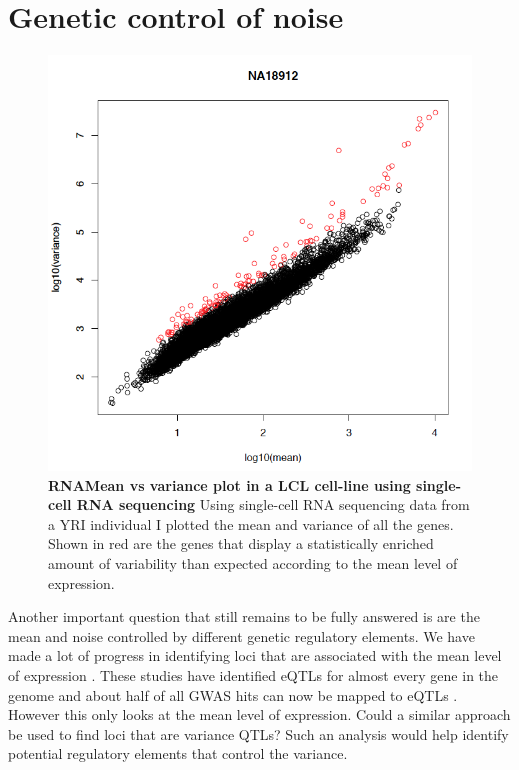 \section{Genetic control of noise}

\begin{figure}[t!]  
    \centering
    \includegraphics[width=\linewidth, scale=0.25]{figures/intro/intro_outlier1.png}
    \caption[RNAMean vs variance plot in a lymphoblastoid cell-line using single-cell RNA sequencing]{%
        \textbf{RNAMean vs variance plot in a LCL cell-line using single-cell RNA sequencing}
        Using single-cell RNA sequencing data from a YRI individual \cite{sarkar_discovery_2018} I plotted the mean and variance of all the genes. Shown in red are the genes that display a statistically enriched amount of variability than expected according to the mean level of expression. 
    }
    \label{fig:intro1}
\end{figure}

Another important question that still remains to be fully answered is are the mean and noise controlled by different genetic regulatory elements. We have made a lot of progress in identifying loci that are associated with the mean level of expression \cite{gtex_consortium_genetic_2017} \cite{vosa2021ng} \cite{wen2017pg}. These studies have identified eQTLs for almost every gene in the genome and about half of all GWAS hits can now be mapped to eQTLs \cite{gtex_consortium_genetic_2017}. However this only looks at the mean level of expression. Could a similar approach be used to find loci that are variance QTLs? Such an analysis would help identify potential regulatory elements that control the variance.

